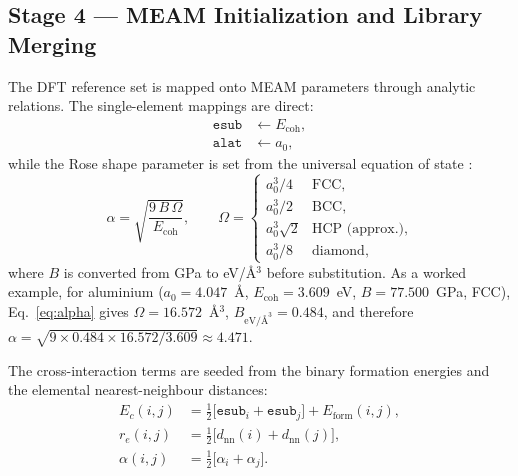 \subsection{Stage 4 --- MEAM Initialization and Library Merging}
\label{sec:stage4}

The DFT reference set is mapped onto MEAM parameters through analytic
relations. The single-element mappings are direct:
\begin{align*}
	\texttt{esub} &\leftarrow E_\mathrm{coh}, \\
	\texttt{alat} &\leftarrow a_0,
\end{align*}
while the Rose shape parameter is set from the universal equation of state
\citep{vinet1989universal}:
\begin{equation}
	\alpha = \sqrt{\frac{9\,B\,\Omega}{E_\mathrm{coh}}}, \qquad
	\Omega = \begin{cases}
		a_0^3/4              & \text{FCC}, \\
		a_0^3/2              & \text{BCC}, \\
		a_0^3 \sqrt{2}       & \text{HCP (approx.)}, \\
		a_0^3/8              & \text{diamond},
	\end{cases}
	\label{eq:alpha}
\end{equation}
where $B$ is converted from GPa to eV/\AA{}$^3$ before substitution. As a
worked example, for aluminium ($a_0=4.047$~\AA, $E_\mathrm{coh}=3.609$~eV,
$B=77.500$~GPa, FCC), Eq.~\eqref{eq:alpha} gives
$\Omega=16.572$~\AA{}$^3$, $B_{\text{eV/\AA{}}^3}=0.484$, and therefore
$\alpha = \sqrt{9 \times 0.484 \times 16.572 / 3.609} \approx 4.471$.

The cross-interaction terms are seeded from the binary formation energies
and the elemental nearest-neighbour distances:
\begin{align}
	E_c(i,j)     &= \tfrac{1}{2}\bigl[\texttt{esub}_i + \texttt{esub}_j\bigr] + E_\mathrm{form}(i,j), \\
	r_e(i,j)     &= \tfrac{1}{2}\bigl[d_\mathrm{nn}(i) + d_\mathrm{nn}(j)\bigr], \\
	\alpha(i,j)  &= \tfrac{1}{2}\bigl[\alpha_i + \alpha_j\bigr].
\end{align}

